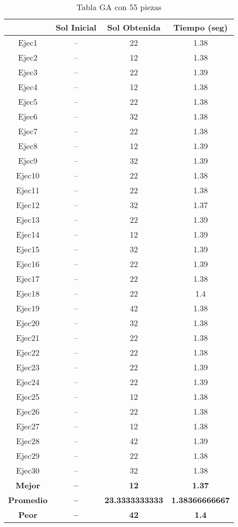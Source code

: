 \begin{center}
\begin{table}

\begin{tabular}{|c|c|c|c|}
\hline
 & {\bf Sol Inicial} & {\bf Sol Obtenida} & {\bf Tiempo (seg)} \\
\hline
Ejec1 & -- & 22  & 1.38 \\
\hline
Ejec2 & -- & 12  & 1.38 \\
\hline
Ejec3 & -- & 22  & 1.39 \\
\hline
Ejec4 & -- & 12  & 1.38 \\
\hline
Ejec5 & -- & 22  & 1.38 \\
\hline
Ejec6 & -- & 32  & 1.38 \\
\hline
Ejec7 & -- & 22  & 1.38 \\
\hline
Ejec8 & -- & 12  & 1.39 \\
\hline
Ejec9 & -- & 32  & 1.39 \\
\hline
Ejec10 & -- & 22  & 1.38 \\
\hline
Ejec11 & -- & 22  & 1.38 \\
\hline
Ejec12 & -- & 32  & 1.37 \\
\hline
Ejec13 & -- & 22  & 1.39 \\
\hline
Ejec14 & -- & 12  & 1.39 \\
\hline
Ejec15 & -- & 32  & 1.39 \\
\hline
Ejec16 & -- & 22  & 1.39 \\
\hline
Ejec17 & -- & 22  & 1.38 \\
\hline
Ejec18 & -- & 22  & 1.4 \\
\hline
Ejec19 & -- & 42  & 1.38 \\
\hline
Ejec20 & -- & 32  & 1.38 \\
\hline
Ejec21 & -- & 22  & 1.38 \\
\hline
Ejec22 & -- & 22  & 1.38 \\
\hline
Ejec23 & -- & 22  & 1.39 \\
\hline
Ejec24 & -- & 22  & 1.39 \\
\hline
Ejec25 & -- & 12  & 1.38 \\
\hline
Ejec26 & -- & 22  & 1.38 \\
\hline
Ejec27 & -- & 12  & 1.38 \\
\hline
Ejec28 & -- & 42  & 1.39 \\
\hline
Ejec29 & -- & 22  & 1.38 \\
\hline
Ejec30 & -- & 32  & 1.38 \\
\hline
{\bf Mejor} & {\bf -- } & {\bf 12} & {\bf 1.37} \\
\hline
{\bf Promedio} & {\bf -- } & {\bf 23.3333333333} & {\bf 1.38366666667} \\
\hline
{\bf Peor} & {\bf -- } & {\bf 42} & {\bf 1.4} \\
\hline
\end{tabular}
\caption{Tabla GA con 55 piezas}


\end{table}
\end{center}
